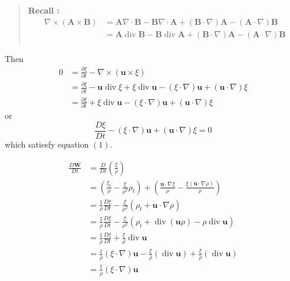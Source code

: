 \begin{quote}
	\textbf{Recall : }
\begin{equation}
\begin{aligned}
\nabla\times\left(\textbf{A}\times \textbf{B}\right)
&= \textbf{A} \nabla \cdot \textbf{B}
- \textbf{B}\nabla\cdot \textbf{A}
+ \left(\textbf{B}\cdot\nabla\right)\textbf{A}
- \left(\textbf{A}\cdot\nabla\right)\textbf{B}\\
&= \textbf{A} \operatorname{div} \textbf{B}
- \textbf{B}\operatorname{div} \textbf{A}
+ \left(\textbf{B}\cdot\nabla\right)\textbf{A}
- \left(\textbf{A}\cdot\nabla\right)\textbf{B}\\
\end{aligned}
\end{equation}

\end{quote}
Then
\begin{equation}
\begin{aligned}
0 &= \frac{\partial \xi}{\partial t} - \nabla \times\left(\textbf{u}\times \xi\right)\\
&= \frac{\partial \xi}{\partial t}
- \textbf{u} \operatorname{div} \xi
+ \xi \operatorname{div} \textbf{u}
- \left(\xi\cdot\nabla\right)\textbf{u}
+ \left(\textbf{u}\cdot\nabla\right)\xi\\
&= \frac{\partial \xi}{\partial t}
+ \xi \operatorname{div} \textbf{u}
- \left(\xi\cdot\nabla\right)\textbf{u}
+ \left(\textbf{u}\cdot\nabla\right)\xi
\end{aligned}
\end{equation}
or 
\begin{equation}
\frac{D\xi}{Dt} - \left(\xi\cdot\nabla\right)\textbf{u} + \left(\textbf{u}\cdot\nabla\right)\xi = 0
\end{equation}
which satiesfy equation $(1)$. 



\begin{equation}
\begin{aligned}
\frac{D\textbf{W}}{Dt}
&= \frac{D}{Dt}\left(\frac{\xi}{\rho}\right)\\
&= \left(\frac{\xi_t}{\rho} - \frac{\xi}{\rho^2}\rho_t\right)
+ \left(\frac{\textbf{u}\cdot\nabla \xi}{\rho}
- \frac{\xi\left(\textbf{u}\cdot\nabla \rho\right)}{\rho} \right)\\
&= \frac{1}{\rho} \frac{D\xi}{Dt} - \frac{\xi}{\rho^2}\left(\rho_t + \textbf{u}\cdot\nabla\rho\right)\\
&= \frac{1}{\rho} \frac{D\xi}{Dt} - \frac{\xi}{\rho^2}\left(\rho_t + \operatorname{div}(\textbf{u}\rho) - \rho\operatorname{div}\textbf{u} \right)\\
&=\frac{1}{\rho} \frac{D\xi}{Dt} + \frac{\xi}{\rho}\operatorname{div}\textbf{u}\\
&= \frac{1}{\rho}\left(\xi\cdot\nabla\right)\textbf{u} - \frac{\xi}{\rho}\left(\operatorname{div}\textbf{u}\right) + \frac{\xi}{\rho}\left(\operatorname{div}\textbf{u}\right)\\
&= \frac{1}{\rho}\left(\xi\cdot\nabla\right)\textbf{u}
\end{aligned}
\end{equation}

